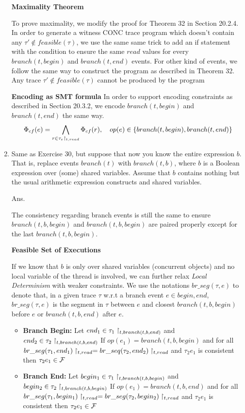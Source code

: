 \documentclass{article}
\begin{document}
\begin{enumerate}
\textbf{Maximality Theorem}

To prove maximality, we modify the proof for Theorem 32 in Section 20.2.4.
In order to generate a witness CONC trace program which doesn't contain any 
$\tau' \notin feasible(\tau)$,
we use the same same trick to add an if statement with the condition
to ensure the same $read$ values for every $branch(t, begin)$ and
$branch(t, end)$ events.
For other kind of events, we follow the same way to construct the program
as described in Theorem 32. 
Any trace $\tau'\notin feasible(\tau)$ cannot be produced by the program

\textbf{Encoding as SMT formula}
In order to support encoding constraints as described in Section 20.3.2,
we encode $branch(t, begin)$ and $branch(t, end)$ the same way.
$$
\Phi_{cf}(e) = \bigwedge_{r \in \tau_e \upharpoonright_{t, read}} \Phi_{cf}(r),
\quad op(e) \in \{branch(t, begin), branch(t, end)\}
$$

\item Same as Exercise 30, but suppose that now you know the entire expression $b$.
That is, replace events $branch(t)$ with $branch(t,b)$,
where $b$ is a Boolean expression over (some) shared variables.
Assume that $b$ contains nothing but the usual arithmetic expression constructs
and shared variables.

Ans.

The consistency regarding branch events is still the same to ensure $branch(t, b, begin)$
and $branch(t, b, begin)$ are paired properly except for the last $branch(t, b, begin)$.


\textbf{Feasible Set of Executions}

If we know that $b$ is only over shared variables (concurrent objects) and
no local variable of the thread is involved,
we can further relax \emph{Local Determinism} with weaker constraints.
We use the notations $br\_seg(\tau, e)$ to denote that,
in a given trace $\tau$ w.r.t a branch event $e \in {begin, end}$,
$br\_seg(\tau, e)$ is the segment in $\tau$ between $e$ and closest
$branch(t, b, begin)$ before $e$ or $branch(t, b, end)$ after $e$.

\begin{itemize}
\item \textbf{Branch Begin:}\newline
	Let $end_1 \in \tau_1\upharpoonright_{t,branch(t,b,end)}$ and
	$end_2 \in \tau_2\upharpoonright_{t,branch(t,b,end)}$\newline
	If $op(e_1) = branch(t, b, begin)$ and for all
	$br\_seg(\tau_1, end_1)\upharpoonright_{t,read} = br\_seq(\tau_2, end_2)\upharpoonright_{t,read}$
	and $\tau_2 e_1$ is consistent
	then $\tau_2 e_1 \in \mathcal{F}$
\item \textbf{Branch End:}\newline
	Let $begin_1 \in \tau_1\upharpoonright_{t,branch(t,b,begin)}$ and
	$begin_2 \in \tau_2\upharpoonright_{t,branch(t,b,begin)}$\newline
	If $op(e_1) = branch(t, b, end)$ and for all
	$br\_seg(\tau_1, begin_1)\upharpoonright_{t,read} = br\_seg(\tau_2, begin_2)\upharpoonright_{t,read}$
	and $\tau_2 e_1$ is consistent
	then $\tau_2 e_1 \in \mathcal{F}$
\end{itemize}


\end{enumerate}
\end{document}
